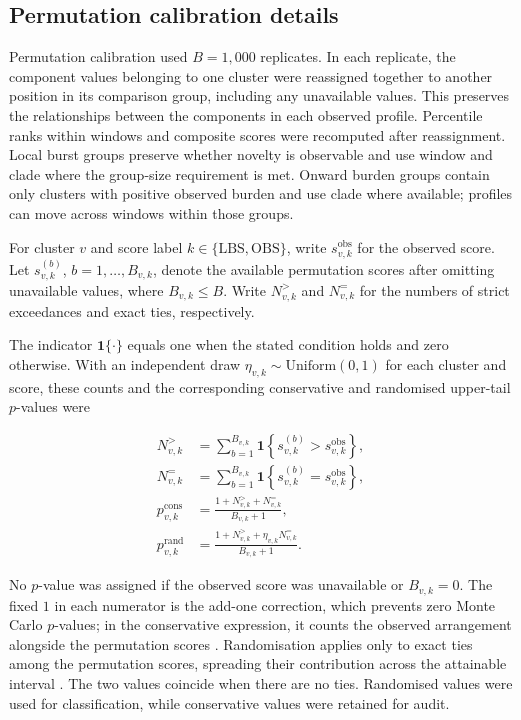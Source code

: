 \subsection{Permutation calibration details}\label{sec:app_ch5_permutation_calibration}

Permutation calibration used $B=1{,}000$ replicates. In each replicate, the component values belonging to one cluster were reassigned together to another position in its comparison group, including any unavailable values. This preserves the relationships between the components in each observed profile. Percentile ranks within windows and composite scores were recomputed after reassignment. Local burst groups preserve whether novelty is observable and use window and clade where the group-size requirement is met. Onward burden groups contain only clusters with positive observed burden and use clade where available; profiles can move across windows within those groups.

For cluster $v$ and score label $k\in\{\mathrm{LBS},\mathrm{OBS}\}$, write $s_{v,k}^{\mathrm{obs}}$ for the observed score. Let $s_{v,k}^{(b)}$, $b=1,\ldots,B_{v,k}$, denote the available permutation scores after omitting unavailable values, where $B_{v,k}\leq B$. Write $N_{v,k}^{>}$ and $N_{v,k}^{=}$ for the numbers of strict exceedances and exact ties, respectively.

The indicator $\mathbf{1}\{\cdot\}$ equals one when the stated condition holds and zero otherwise. With an independent draw $\eta_{v,k}\sim\mathrm{Uniform}(0,1)$ for each cluster and score, these counts and the corresponding conservative and randomised upper-tail $p$-values were

\begin{align*}
    N_{v,k}^{>} &= \sum_{b=1}^{B_{v,k}}
    \mathbf{1}\!\left\{s_{v,k}^{(b)}>s_{v,k}^{\mathrm{obs}}\right\}, \\
    N_{v,k}^{=} &= \sum_{b=1}^{B_{v,k}}
    \mathbf{1}\!\left\{s_{v,k}^{(b)}=s_{v,k}^{\mathrm{obs}}\right\}, \\[6pt]
    p_{v,k}^{\mathrm{cons}} &=
    \frac{1+N_{v,k}^{>}+N_{v,k}^{=}}{B_{v,k}+1}, \\
    p_{v,k}^{\mathrm{rand}} &=
    \frac{1+N_{v,k}^{>}+\eta_{v,k}N_{v,k}^{=}}{B_{v,k}+1}.
\end{align*}

No $p$-value was assigned if the observed score was unavailable or $B_{v,k}=0$. The fixed $1$ in each numerator is the add-one correction, which prevents zero Monte Carlo $p$-values; in the conservative expression, it counts the observed arrangement alongside the permutation scores \citep{Phipson2010,Hemerik2017}. Randomisation applies only to exact ties among the permutation scores, spreading their contribution across the attainable interval \citep{Habiger2010}. The two values coincide when there are no ties. Randomised values were used for classification, while conservative values were retained for audit.

